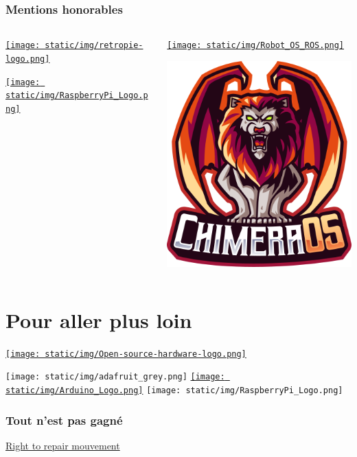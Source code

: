 \documentclass{beamer}
\begin{document}
\begin{frame}
	\frametitle{Mentions honorables}
	
		\begin{columns}
		\begin{column}{.5\linewidth}
			\centering
			\href{https://retropie.org.uk/}{\texttt{[image: static/img/retropie-logo.png]}}
			
			\href{https://www.raspberrypi.com/software/}{\texttt{[image: static/img/RaspberryPi\_Logo.png]}}
		\end{column}
		
		\begin{column}{.5\linewidth}
			\centering
			\href{https://www.ros.org/}{\texttt{[image: static/img/Robot\_OS\_ROS.png]}}
			
			\href{https://chimeraos.org/}{\includegraphics[width=.5\linewidth]{static/img/chimeraos.png}}
		\end{column}
	\end{columns}
\end{frame}

\section{Pour aller plus loin}

\begin{frame}
	\centering
	\href{https://www.oshwa.org/}{\texttt{[image: static/img/Open-source-hardware-logo.png]}}
\end{frame}

\begin{frame}
	\texttt{[image: static/img/adafruit\_grey.png]}\hfill
	\href{https://www.arduino.cc/}{\texttt{[image: static/img/Arduino\_Logo.png]}}\hfill
	\texttt{[image: static/img/RaspberryPi\_Logo.png]}
\end{frame}

\begin{frame}
	\frametitle{Tout n'est pas gagné}
	\centering
	{\LARGE \href{https://en.wikipedia.org/wiki/Electronics_right_to_repair}{Right to repair mouvement}}
	
\end{frame}

\section*{}

\begin{frame}
	\titlepage
\end{frame}
\end{document}
